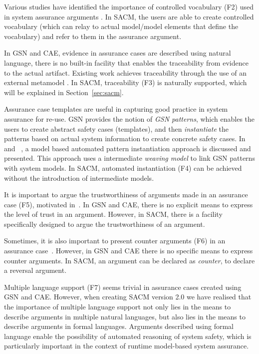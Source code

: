 Various studies have identified the importance of controlled vocabulary (F2) used in system assurance arguments \cite{luo2015safety, attwood2014use}. 
In SACM, the users are able to create controlled vocabulary (which can relay to actual model/model elements that define the vocabulary) and refer to them in the assurance argument. 

In GSN and CAE, evidence in assurance cases are described using natural language, there is no built-in facility that enables the traceability from evidence to the actual artifact. 
Existing work achieves traceability through the use of an external metamodel \cite{taguchi2014linking}.
In SACM, traceability (F3) is naturally supported, which will be explained in Section~\ref{sec:sacm}.

Assurance case templates are useful in capturing good practice in system assurance for re-use.
GSN provides the notion of \textit{GSN patterns}, which enables the users to create abstract safety cases (templates), and then \textit{instantiate} the patterns based on actual system information to create concrete safety cases. 
In~\cite{hawkins2015need} and ~\cite{hawkins2015weaving}, a model based automated pattern instantiation approach is discussed and presented. 
This approach uses a intermediate \textit{weaving model} to link GSN patterns with system models. 
In SACM, automated instantiation (F4) can be achieved without the introduction of intermediate models.

It is important to argue the trustworthiness of arguments made in an assurance case (F5), motivated in~\cite{fenn2005putting}. 
In GSN and CAE, there is no explicit means to express the level of trust in an argument. 
However, in SACM, there is a facility specifically designed to argue the trustworthiness of an argument.

Sometimes, it is also important to present counter arguments (F6) in an assurance case~\cite{armstrong2004deconstruction}.
However, in GSN and CAE there is no specific means to express counter arguments. 
In SACM, an argument can be declared as \textit{counter}, to declare a reversal argument.

Multiple language support (F7) seems trivial in assurance cases created using GSN and CAE.
However, when creating SACM version 2.0 we have realised that the importance of multiple language support not only lies in the means to describe arguments in multiple natural languages, but also lies in the means to describe arguments in formal languages.
Arguments described using formal language enable the possibility of automated reasoning of system safety, which is particularly important in the context of runtime model-based system assurance.

